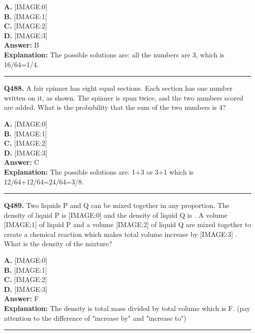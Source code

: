 \documentclass[12pt]{article}
\begin{document}
\textbf{A.} [IMAGE:0] \\
\textbf{B.} [IMAGE:1] \\
\textbf{C.} [IMAGE:2] \\
\textbf{D.} [IMAGE:3] \\

\textbf{Answer:} B \\
\textbf{Explanation:} The possible solutions are: all the numbers are 3, which is 16/64=1/4.

\hrule
\vspace{1em}


\noindent
\textbf{Q488.} A fair spinner has eight equal sections. Each section has one number written on it, as shown.
The spinner is spun twice, and the two numbers scored are added. What is the probability that the sum of the two numbers is 4?



\textbf{A.} [IMAGE:0] \\
\textbf{B.} [IMAGE:1] \\
\textbf{C.} [IMAGE:2] \\
\textbf{D.} [IMAGE:3] \\

\textbf{Answer:} C \\
\textbf{Explanation:} The possible solutions are: 1+3 or 3+1 which is 12/64+12/64=24/64=3/8.

\hrule
\vspace{1em}


\noindent
\textbf{Q489.} Two liquids P and Q can be mixed together in any proportion. The density of liquid P is
[IMAGE:0]
and the density of liquid Q is
. A volume
[IMAGE:1]
of liquid P and a volume
[IMAGE:2]
of liquid Q are mixed together to create a chemical reaction which makes total volume increase by
[IMAGE:3]
. What is the density of the mixture?



\textbf{A.} [IMAGE:0] \\
\textbf{B.} [IMAGE:1] \\
\textbf{C.} [IMAGE:2] \\
\textbf{D.} [IMAGE:3] \\

\textbf{Answer:} F \\
\textbf{Explanation:} The density is total mass divided by total volume which is F. (pay attention to the difference of "increase by" and "increase to")

\hrule
\vspace{1em}
\end{document}
